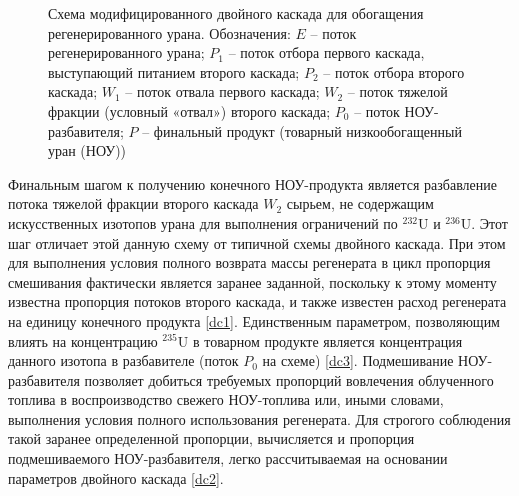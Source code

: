 \begin{figure}[ht]
    \caption{Схема модифицированного двойного каскада для обогащения регенерированного урана. Обозначения: $E$ -- поток регенерированного урана; $P_1$ -- поток отбора первого каскада, выступающий питанием второго каскада; $P_2$ -- поток отбора второго каскада; $W_1$ -- поток отвала первого каскада; $W_2$ -- поток тяжелой фракции (условный «отвал») второго каскада; $P_0$ -- поток НОУ-разбавителя; $P$ -- финальный продукт (товарный низкообогащенный уран (НОУ))}\label{p2left}
\end{figure}

Финальным шагом к получению конечного НОУ-продукта является разбавление потока тяжелой фракции второго каскада $W_2$ сырьем, не содержащим искусственных изотопов урана для выполнения ограничений по $^{232}$U и $^{236}$U.
Этот шаг отличает этой данную схему от типичной схемы двойного каскада.
При этом для выполнения условия полного возврата массы регенерата в цикл пропорция смешивания фактически является заранее заданной, поскольку к этому моменту известна пропорция потоков второго каскада, и также известен расход регенерата на единицу конечного продукта \ref{dc1}. Единственным параметром, позволяющим влиять на концентрацию $^{235}$U в товарном продукте является концентрация данного изотопа в разбавителе (поток $P_0$ на схеме) \ref{dc3}.
Подмешивание НОУ-разбавителя позволяет добиться требуемых пропорций вовлечения облученного топлива в воспроизводство свежего НОУ-топлива или, иными словами, выполнения условия полного использования регенерата. Для строгого соблюдения такой заранее определенной пропорции, вычисляется и пропорция подмешиваемого НОУ-разбавителя, легко рассчитываемая на основании параметров двойного каскада \ref{dc2}.

